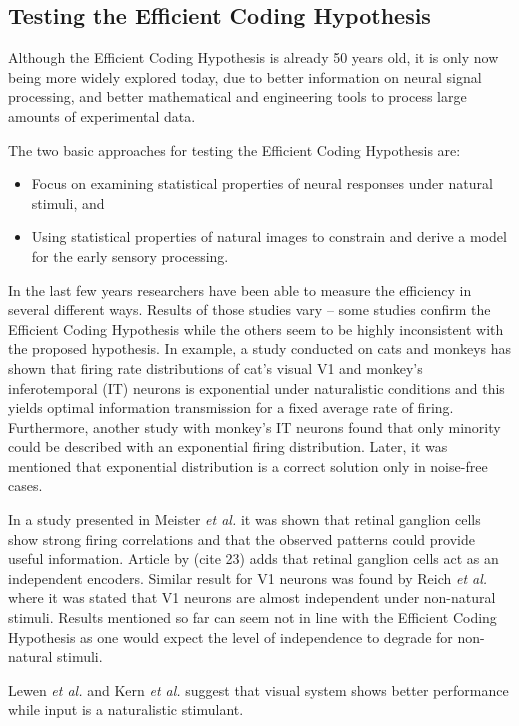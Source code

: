 \documentclass[twoside]{article}
\begin{document}
\begin{multicols}{2}
\subsection{Testing the Efficient Coding Hypothesis}

Although the Efficient Coding Hypothesis is already 50 years old, it is only now being more widely explored today, due to better information on neural signal processing, and better mathematical and engineering tools to process large amounts of experimental data.

The two basic approaches for testing the Efficient Coding Hypothesis are:
\begin{itemize} 
	\item Focus on examining statistical properties of neural responses under natural stimuli, and 
	\item Using statistical properties of natural images to constrain and derive a model for the early sensory processing.
\end{itemize}

In the last few years researchers have been able to measure the efficiency in several different ways. Results of those studies vary – some studies confirm the Efficient Coding Hypothesis while the others seem to be highly inconsistent with the proposed hypothesis.  In example, a study conducted on cats and monkeys has shown that firing rate distributions of cat's visual V1 and monkey's inferotemporal (IT) neurons is exponential under naturalistic conditions and this yields optimal information transmission for a fixed average rate of firing. Furthermore, another study with monkey's IT neurons found that only minority could be described with an exponential firing distribution. Later, it was mentioned that exponential distribution is a correct solution only in noise-free cases. 

In a study presented in Meister \textit{et al.} it was shown that retinal ganglion cells show strong firing correlations and that the observed patterns could provide useful information.  Article by (cite 23) adds that retinal ganglion cells act as an independent encoders. Similar result for V1 neurons was found by Reich \textit{et al.} where it was stated that V1 neurons are almost independent under non-natural stimuli. Results mentioned so far can seem not in line with the Efficient Coding Hypothesis as one would expect the level of independence to degrade for non-natural stimuli. 

Lewen \textit{et al.} and Kern \textit{et al.} suggest that visual system shows better performance while input is a naturalistic stimulant. 


\end{multicols}
\end{document}
